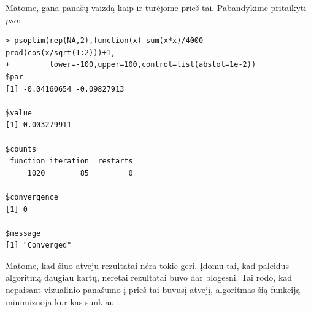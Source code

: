 \documentclass[12pt,a4paper]{article}
\begin{document}
Matome, gana panašų vaizdą kaip ir turėjome prieš tai. Pabandykime pritaikyti $pso$:



\begin{spacing}{1}
\begin{verbatim}
> psoptim(rep(NA,2),function(x) sum(x*x)/4000-prod(cos(x/sqrt(1:2)))+1,
+         lower=-100,upper=100,control=list(abstol=1e-2))
$par
[1] -0.04160654 -0.09827913

$value
[1] 0.003279911

$counts
 function iteration  restarts 
     1020        85         0 

$convergence
[1] 0

$message
[1] "Converged"
\end{verbatim}
\end{spacing}

\bigskip

 Matome, kad šiuo atveju rezultatai nėra tokie geri. Įdomu tai, kad paleidus algoritmą daugiau kartų, neretai rezultatai buvo dar blogesni. Tai rodo, kad nepaisant vizualinio panašumo į prieš tai buvusį atvejį, algoritmas šią funkciją minimizuoja kur kas sunkiau .
 
\end{document}
